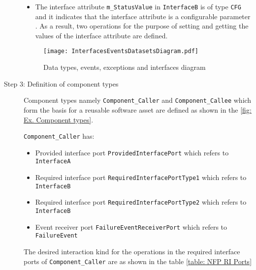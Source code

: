 \begin{description}
\begin{itemize}
\item The interface attribute \texttt{m\_StatusValue} in \texttt{InterfaceB} is of type \texttt{CFG} and it indicates that the interface attribute is a configurable parameter \cite{SpecMetamodel}. As a result, two operations for the purpose of setting and getting the values of the interface attribute are defined.      
\end{itemize}

\begin{figure}[h]
	\centering
	\texttt{[image: InterfacesEventsDatasetsDiagram.pdf]}
	\caption{Data types, events, exceptions and interfaces diagram}
	\label{fig: Ex. Datatypes etc.}
\end{figure}

\item [Step 3: Definition of component types] Component types namely \texttt{Component\allowbreak\_Caller} and \texttt{Component\allowbreak\_Callee} which form the basis for a reusable software asset are defined as shown in the \cref{fig: Ex. Component types}. 

\texttt{Component\allowbreak\_Caller} has:
\begin{itemize}
\item Provided interface port \texttt{Provided\allowbreak Interface\allowbreak Port} which refers to \texttt{InterfaceA}
\item Required interface port \texttt{Required\allowbreak Interface\allowbreak PortType1} which refers to \texttt{InterfaceB}
\item Required interface port \texttt{Required\allowbreak Interface\allowbreak PortType2} which refers to \texttt{InterfaceB}
\item Event receiver port \texttt{FailureEvent\allowbreak ReceiverPort} which refers to \texttt{Failure\allowbreak Event}
\end{itemize}

The desired interaction kind for the operations in the required interface ports of \texttt{Component\allowbreak\_Caller} are as shown in the table \cref{table: NFP RI Ports}


\end{description}
